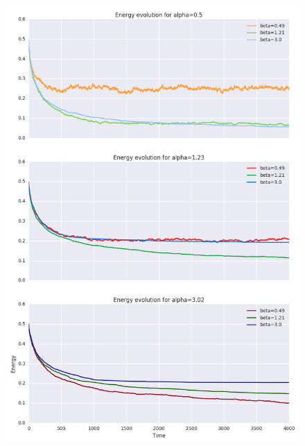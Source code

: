 \documentclass[twocolumn]{article}
\begin{document}
\begin{figure}[!h]
	\includegraphics[width=\columnwidth]{../tobekept/ex1_8526750515376798568-r.png}
\end{figure}

\newpage
\newpage
\end{document}
